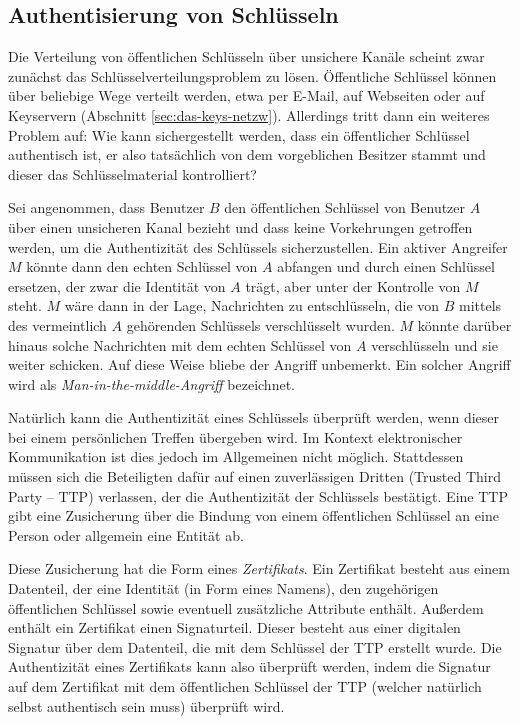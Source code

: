 \subsection{Authentisierung von Schlüsseln}
\label{ch:Grundlagen:sec:PublicKeyCrypto:subsec:KeyAuth}
Die Verteilung von öffentlichen Schlüsseln über unsichere
Kanäle scheint zwar zunächst das
Schlüsselverteilungsproblem zu lösen. Öffentliche Schlüssel
können über beliebige Wege verteilt werden, etwa per E-Mail, auf
Webseiten oder auf Keyservern (Abschnitt
\ref{sec:das-keys-netzw}). Allerdings tritt dann ein weiteres Problem
auf: Wie kann sichergestellt werden, dass ein öffentlicher
Schlüssel authentisch ist, er also tatsächlich von dem
vorgeblichen Besitzer stammt und dieser das Schlüsselmaterial
kontrolliert? 

Sei angenommen, dass Benutzer $B$ den öffentlichen Schlüssel von
Benutzer $A$ über einen unsicheren Kanal bezieht und dass keine
Vorkehrungen getroffen werden, um die Authentizität des Schlüssels
sicherzustellen. Ein aktiver Angreifer $M$ könnte dann den echten
Schlüssel von $A$ abfangen und durch einen Schlüssel ersetzen, der
zwar die Identität von $A$ trägt, aber unter der Kontrolle von $M$
steht. $M$ wäre dann in der Lage, Nachrichten zu entschlüsseln, die
von $B$ mittels des vermeintlich $A$ gehörenden Schlüssels
verschlüsselt wurden. $M$ könnte darüber hinaus solche Nachrichten mit
dem echten Schlüssel von $A$ verschlüsseln und sie weiter
schicken. Auf diese Weise bliebe der Angriff unbemerkt. Ein solcher
Angriff wird als \emph{Man-in-the-middle-Angriff} bezeichnet.

Natürlich kann die Authentizität eines Schlüssels überprüft
werden, wenn dieser bei einem persönlichen Treffen übergeben
wird. Im Kontext elektronischer Kommunikation ist dies jedoch im
Allgemeinen nicht möglich. Stattdessen m\"ussen sich die Beteiligten dafür auf einen
zuverlässigen Dritten (Trusted Third Party -- TTP) verlassen,
der die Authentizität der Schlüssels bestätigt. Eine TTP gibt
eine Zusicherung über die Bindung von einem öffentlichen
Schlüssel an eine Person oder allgemein eine Entität ab.

Diese Zusicherung hat die Form eines \emph{Zertifikats}. Ein
Zertifikat besteht aus einem Datenteil, der eine Identität (in Form
eines Namens), den zugehörigen öffentlichen Schlüssel sowie
eventuell zusätzliche Attribute enthält. Außerdem enthält ein
Zertifikat einen Signaturteil. Dieser besteht aus einer digitalen
Signatur über dem Datenteil, die mit dem Schlüssel der TTP
erstellt wurde. Die Authentizität eines Zertifikats kann also
überprüft werden, indem die Signatur auf dem Zertifikat mit dem
öffentlichen Schlüssel der TTP (welcher natürlich selbst
authentisch sein muss) überprüft wird.

